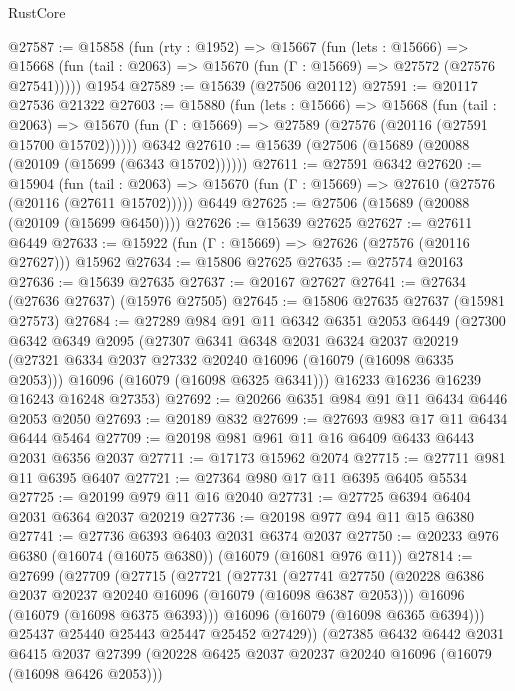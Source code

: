 \begin{lexlean}{RustCore}
\begin{coremodule}
@27587 := @15858
    (fun (rty : @1952) =>
    @15667
      (fun (lets : @15666) =>
      @15668 (fun (tail : @2063) => @15670 (fun (Γ : @15669) => @27572 (@27576 @27541)))))
    @1954
@27589 := @15639 (@27506 @20112)
@27591 := @20117 @27536 @21322
@27603 := @15880
    (fun (lets : @15666) =>
    @15668
      (fun (tail : @2063) =>
      @15670 (fun (Γ : @15669) => @27589 (@27576 (@20116 (@27591 @15700 @15702))))))
    @6342
@27610 := @15639 (@27506 (@15689 (@20088 (@20109 (@15699 (@6343 @15702))))))
@27611 := @27591 @6342
@27620 := @15904
    (fun (tail : @2063) => @15670 (fun (Γ : @15669) => @27610 (@27576 (@20116 (@27611 @15702)))))
    @6449
@27625 := @27506 (@15689 (@20088 (@20109 (@15699 @6450))))
@27626 := @15639 @27625
@27627 := @27611 @6449
@27633 := @15922 (fun (Γ : @15669) => @27626 (@27576 (@20116 @27627))) @15962
@27634 := @15806 @27625
@27635 := @27574 @20163
@27636 := @15639 @27635
@27637 := @20167 @27627
@27641 := @27634 (@27636 @27637) (@15976 @27505)
@27645 := @15806 @27635 @27637 (@15981 @27573)
@27684 := @27289
    @984
    @91
    @11
    @6342
    @6351
    @2053
    @6449
    (@27300
      @6342
      @6349
      @2095
      (@27307
        @6341
        @6348
        @2031
        @6324
        @2037
        @20219
        (@27321 @6334 @2037 @27332 @20240 @16096 (@16079 (@16098 @6335 @2053)))
        @16096
        (@16079 (@16098 @6325 @6341)))
      @16233
      @16236
      @16239
      @16243
      @16248
      @27353)
@27692 := @20266 @6351 @984 @91 @11 @6434 @6446 @2053 @2050
@27693 := @20189 @832
@27699 := @27693 @983 @17 @11 @6434 @6444 @5464
@27709 := @20198 @981 @961 @11 @16 @6409 @6433 @6443 @2031 @6356 @2037
@27711 := @17173 @15962 @2074
@27715 := @27711 @981 @11 @6395 @6407
@27721 := @27364 @980 @17 @11 @6395 @6405 @5534
@27725 := @20199 @979 @11 @16 @2040
@27731 := @27725 @6394 @6404 @2031 @6364 @2037 @20219
@27736 := @20198 @977 @94 @11 @15 @6380
@27741 := @27736 @6393 @6403 @2031 @6374 @2037
@27750 := @20233 @976 @6380 (@16074 (@16075 @6380)) (@16079 (@16081 @976 @11))
@27814 := @27699
    (@27709
      (@27715
        (@27721
          (@27731
            (@27741
              @27750
              (@20228 @6386 @2037 @20237 @20240 @16096 (@16079 (@16098 @6387 @2053)))
              @16096
              (@16079 (@16098 @6375 @6393)))
            @16096
            (@16079 (@16098 @6365 @6394)))
          @25437
          @25440
          @25443
          @25447
          @25452
          @27429))
      (@27385
        @6432
        @6442
        @2031
        @6415
        @2037
        @27399
        (@20228 @6425 @2037 @20237 @20240 @16096 (@16079 (@16098 @6426 @2053)))

\end{coremodule}
\end{lexlean}
